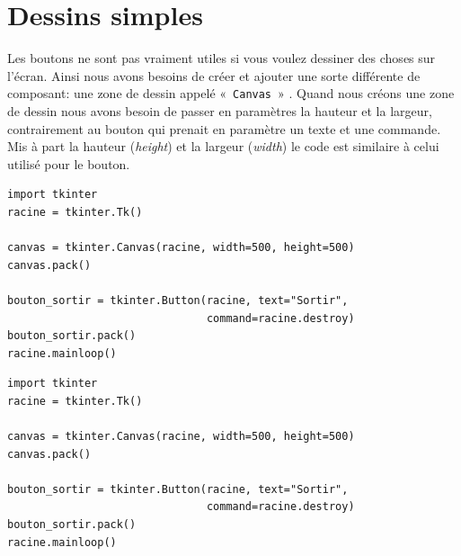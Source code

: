 \section{Dessins simples}

Les boutons ne sont pas vraiment utiles si vous voulez dessiner des choses sur l'écran. Ainsi nous avons besoins de créer et ajouter une sorte différente de composant: une zone de dessin appelé «~\texttt{Canvas}~» . Quand nous créons une zone de dessin nous avons besoin de passer en paramètres la hauteur et la largeur, contrairement au bouton qui prenait en paramètre un texte et une commande. Mis à part la hauteur (\emph{height}) et la largeur (\emph{width}) le code est similaire à celui utilisé pour le bouton.

\begin{Verbatim}[frame=single,rulecolor=\color{mbleu}, label=à taper]
import tkinter
racine = tkinter.Tk()

canvas = tkinter.Canvas(racine, width=500, height=500)
canvas.pack()

bouton_sortir = tkinter.Button(racine, text="Sortir",
                               command=racine.destroy)
bouton_sortir.pack()
racine.mainloop()
\end{Verbatim}

\begin{Verbatim}[frame=single,rulecolor=\color{mbleu}, label=à taper]
import tkinter
racine = tkinter.Tk()

canvas = tkinter.Canvas(racine, width=500, height=500)
canvas.pack()

bouton_sortir = tkinter.Button(racine, text="Sortir",
                               command=racine.destroy)
bouton_sortir.pack()
racine.mainloop()
\end{Verbatim}

